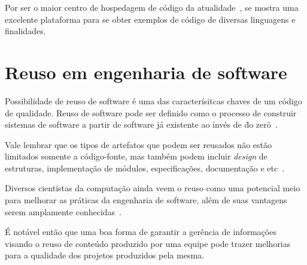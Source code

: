 Por ser o maior centro de hospedagem de código da atualidade~\cite{Gousios2012}, se mostra uma excelente plataforma para se obter exemplos de código de diversas linguagens e finalidades.

\section{Reuso em engenharia de software}

Possibilidade de reuso de software é uma das caracterísitcas chaves de um código de qualidade. Reuso de software pode ser definido como o processo de construir sistemas de software a partir de software já existente ao invés de \"do zero\"~\cite{Krueger1992}.

Vale lembrar que os tipos de artefatos que podem ser reusados não estão limitados somente a código-fonte, mas também podem incluir \textit{design} de estruturas, implementação de módulos, especificações, documentação e etc~\cite{Freeman1993}.

Diversos cientistas da computação ainda veem o reuso como uma potencial meio para melhorar as práticas da engenharia de software, além de suas vantagens serem amplamente conhecidas~\cite{Krueger1992}.

É notável então que uma boa forma de garantir a gerência de informações visando o reuso de conteúdo produzido por uma equipe pode trazer melhorias para a qualidade dos projetos produzidos pela mesma.
